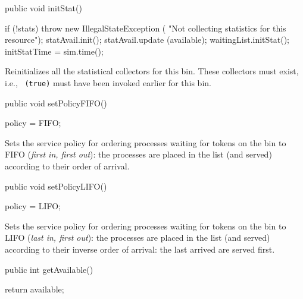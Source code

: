 \begin{htmlonly}
\end{htmlonly}
\begin{code}

   public void initStat()\begin{hide} {
        if (!stats)  throw new IllegalStateException (
                               "Not collecting statistics for this resource");
        statAvail.init();
        statAvail.update (available);
        waitingList.initStat();
        initStatTime = sim.time();
   }\end{hide}
\end{code}
 \begin{tabb}  Reinitializes all the statistical collectors for this
   bin.  These collectors must exist, i.e.,
   ~\texttt{(true)} must have been invoked earlier for
   this bin.
 \end{tabb}
\begin{code}

   public void setPolicyFIFO()\begin{hide} {
      policy = FIFO;
   }\end{hide}
\end{code}
  \begin{tabb}  Sets the service policy for ordering processes waiting
   for tokens on the bin to FIFO (\emph{first in, first out}):
   the processes are placed in the
   list (and served) according to their order of arrival.
   \end{tabb}
\begin{code}

   public void setPolicyLIFO()\begin{hide} {
      policy = LIFO;
   }\end{hide}
\end{code}
   \begin{tabb}  Sets the service policy for ordering processes waiting
   for tokens on the bin to LIFO (\emph{last in, first out}):
    the processes are placed in the
   list (and served) according to their inverse order of arrival:
   the last arrived are served first.
  \end{tabb}
\begin{code}

   public int getAvailable() \begin{hide} {
      return available;
   }\end{hide}
\end{code}
